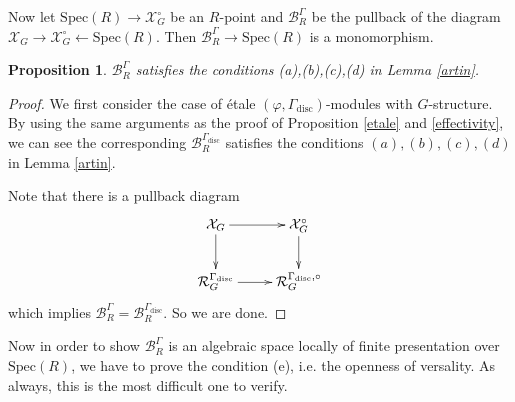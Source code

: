 \documentclass[10pt]{article}
\newtheorem{prop}[thm]{Proposition}
\newtheorem{lem}[thm]{Lemma}
\numberwithin{equation}{section}
\newcommand{\frakm}{{\mathfrak m}}
\newcommand{\bZ}{{\mathbb Z}}
\newcommand{\calB}{{\mathcal B}}
\newcommand{\calR}{{\mathcal R}}
\newcommand{\calX}{{\mathcal X}}
\newcommand{\Spec}{{\mathrm{Spec}}}         %
\newcommand{\disc}{\mathrm{disc}}
\begin{document}




Now let $\Spec(R)\to \calX_G^{\circ}$ be an $R$-point and $\calB_R^{\Gamma}$ be the pullback of the diagram $\calX_G\to \calX_G^{\circ}\leftarrow \Spec(R)$. Then $\calB_R^{\Gamma}\to \Spec(R)$ is a monomorphism.
\begin{prop}\label{etale-gamma}
    $\calB_R^{\Gamma}$ satisfies the conditions (a),(b),(c),(d) in Lemma \ref{artin}.
\end{prop}
\begin{proof}

    We first consider the case of \'etale $(\varphi,\Gamma_{\disc})$-modules with $G$-structure. By using the same arguments as the proof of Proposition \ref{etale} and \ref{effectivity}, we can see the corresponding $\calB_R^{\Gamma_{\disc}}$ satisfies the conditions $(a),(b),(c),(d)$ in Lemma \ref{artin}.

    Note that there is a pullback diagram
    \begin{equation}
        \xymatrix{
        \calX_G\ar[r]\ar[d]&\calX_G^{\circ}\ar[d]\\
        \calR_G^{\Gamma_{\disc}}\ar[r]&\calR_{G}^{\Gamma_{\disc},\circ}
        }
    \end{equation}
    which implies $\calB_R^{\Gamma}=\calB_{R}^{\Gamma_{\disc}}$. So we are done.
\end{proof}

Now in order to show $\calB_R^{\Gamma}$ is an algebraic space locally of finite presentation over $\Spec(R)$, we have to prove the condition (e), i.e. the openness of versality. As always, this is the most difficult one to verify. 
\end{document}
